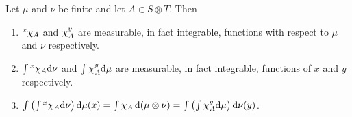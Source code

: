 \begin{lemma}
Let $\mu$ and $\nu$ be finite and let $A\in S\otimes T$. Then

\begin{enumerate}[label=\arabic*)]
    \item $\xsec{\idf{A}}{x}$ and $\ysec{\idf{A}}{y}$ are measurable, in fact integrable, functions with respect to $\mu$ and $\nu$ respectively.

    \item $\int\xsec{\idf{A}}{x}\dd\nu$ and $\int\ysec{\idf{A}}{y}\dd\mu$ are measurable, in fact integrable, functions of $x$ and $y$ respectively.

    \item $\int\br{\int\xsec{\idf{A}}{x}\dd\nu}\dd\mu(x)=\int\idf{A}\dd(\mu\otimes\nu)=\int\br{\int\ysec{\idf{A}}{y}\dd\mu}\dd\nu(y)$.
\end{enumerate}
\end{lemma}

